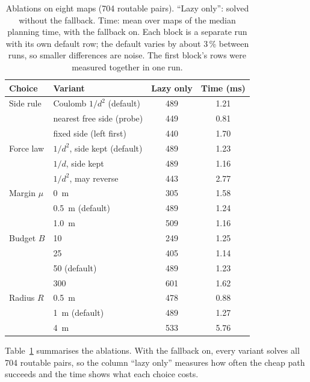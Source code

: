 \documentclass[conference]{IEEEtran}
\begin{document}
\begin{table}[t]
\centering
\caption{Ablations on eight maps (704 routable pairs). ``Lazy only'': solved
without the fallback. Time: mean over maps of the median planning time, with the
fallback on. Each block is a separate run with its own default row; the default
varies by about 3\,\% between runs, so smaller differences are noise. The first
block's rows were measured together in one run.}
\label{tab:ablation}
\setlength{\tabcolsep}{3pt}
\begin{tabular}{@{}llcc@{}}
\toprule
Choice & Variant & Lazy only & Time (ms) \\
\midrule
Side rule   & Coulomb $1/d^2$ (default)   & 489 & 1.21 \\
            & nearest free side (probe)   & 449 & 0.81 \\
            & fixed side (left first)     & 440 & 1.70 \\
\midrule
Force law   & $1/d^2$, side kept (default) & 489 & 1.23 \\
            & $1/d$, side kept            & 489 & 1.16 \\
            & $1/d^2$, may reverse        & 443 & 2.77 \\
\midrule
Margin $\mu$ & \SI{0}{m}                   & 305 & 1.58 \\
            & \SI{0.5}{m} (default)       & 489 & 1.24 \\
            & \SI{1.0}{m}                 & 509 & 1.16 \\
\midrule
Budget $B$  & 10                          & 249 & 1.25 \\
            & 25                          & 405 & 1.14 \\
            & 50 (default)                & 489 & 1.23 \\
            & 300                         & 601 & 1.62 \\
\midrule
Radius $R$  & \SI{0.5}{m}                 & 478 & 0.88 \\
            & \SI{1}{m} (default)         & 489 & 1.27 \\
            & \SI{4}{m}                   & 533 & 5.76 \\
\bottomrule
\end{tabular}
\end{table}

Table~\ref{tab:ablation} summarises the ablations. With the fallback on, every
variant solves all 704 routable pairs, so the column ``lazy only'' measures how
often the cheap path succeeds and the time shows what each choice costs.
\end{document}
